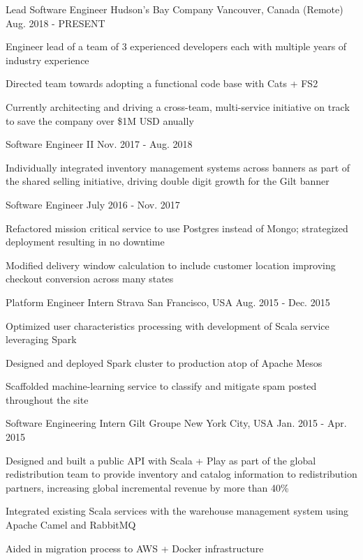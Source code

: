 \begin{cventries}
  \cventry
    {Lead Software Engineer}
    {Hudson's Bay Company}
    {Vancouver, Canada (Remote)}
    {Aug. 2018 - PRESENT}
    {
      \begin{cvitems}
        \item {Engineer lead of a team of 3 experienced developers each with
            multiple years of industry experience}
        \item {Directed team towards adopting a functional code base with Cats + FS2}
        \item {Currently architecting and driving a cross-team, multi-service
            initiative on track to save the company over \$1M USD anually}
      \end{cvitems}
    }
  \cventry
    {Software Engineer II}
    {}
    {}
    {Nov. 2017 - Aug. 2018}
    {
      \begin{cvitems}
        \item {Individually integrated inventory management systems across banners as part of
          the shared selling initiative, driving double digit growth for the
          Gilt banner}
      \end{cvitems}
    }
  \cventry
    {Software Engineer}
    {}
    {}
    {July 2016 - Nov. 2017}
    {
      \begin{cvitems}
        \item {Refactored mission critical service to use Postgres instead of Mongo; strategized deployment resulting in no downtime}
        \item {Modified delivery window calculation to include customer location improving checkout conversion across many states}
      \end{cvitems}
    }
  \cventry
    {Platform Engineer Intern}
    {Strava}
    {San Francisco, USA}
    {Aug. 2015 - Dec. 2015}
    {
      \begin{cvitems}
        \item {Optimized user characteristics processing with development of Scala service leveraging Spark}
        \item {Designed and deployed Spark cluster to production atop of Apache Mesos}
        \item {Scaffolded machine-learning service to classify and mitigate spam posted throughout the site}
      \end{cvitems}
    }
  \cventry
    {Software Engineering Intern}
    {Gilt Groupe}
    {New York City, USA}
    {Jan. 2015 - Apr. 2015}
    {
      \begin{cvitems}
        \item {Designed and built a public API with Scala + Play as part of the global redistribution team to provide inventory and catalog information to redistribution partners, increasing global incremental revenue by more than 40\%}
        \item {Integrated existing Scala services with the warehouse management system using Apache Camel and RabbitMQ}
        \item {Aided in migration process to AWS + Docker infrastructure}
      \end{cvitems}
    }
\end{cventries}
